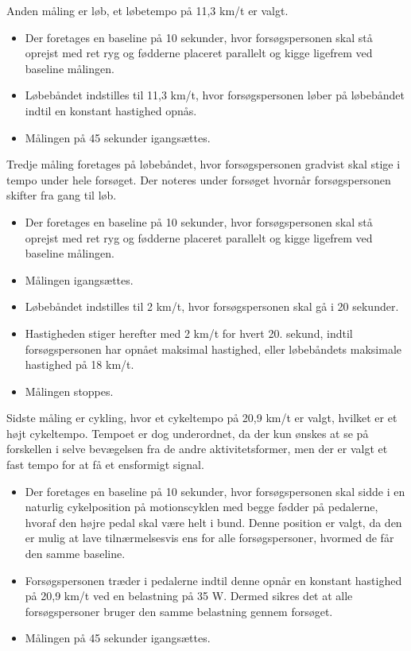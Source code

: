 Anden måling er løb, et løbetempo på 11,3 km/t er valgt\citep{Miles2007}. \vspace{-3mm}
\begin{itemize}
	\item Der foretages en baseline på 10 sekunder, hvor forsøgspersonen skal stå oprejst med ret ryg og fødderne placeret parallelt og kigge ligefrem ved baseline målingen.
	\item Løbebåndet indstilles til 11,3 km/t, hvor forsøgspersonen løber på løbebåndet indtil en konstant hastighed opnås. 
	\item Målingen på 45 sekunder igangsættes.
\end{itemize}

Tredje måling foretages på løbebåndet, hvor forsøgspersonen gradvist skal stige i tempo under hele forsøget. Der noteres under forsøget hvornår forsøgspersonen skifter fra gang til løb.  \vspace{-3mm}
\begin{itemize}
	\item Der foretages en baseline på 10 sekunder, hvor forsøgspersonen skal stå oprejst med ret ryg og fødderne placeret parallelt og kigge ligefrem ved baseline målingen.
	\item Målingen igangsættes.
	\item Løbebåndet indstilles til 2 km/t, hvor forsøgspersonen skal gå i 20 sekunder.  
	\item Hastigheden stiger herefter med 2 km/t for hvert 20. sekund, indtil forsøgspersonen har opnået maksimal hastighed, eller løbebåndets maksimale hastighed på 18 km/t. 
	\item Målingen stoppes. 
\end{itemize}

Sidste måling er cykling, hvor et cykeltempo på 20,9 km/t er valgt, hvilket er et højt cykeltempo\citep{Miles2007}. Tempoet er dog underordnet, da der kun ønskes at se på forskellen i selve bevægelsen fra de andre aktivitetsformer, men der er valgt et fast tempo for at få et ensformigt signal. \vspace{-3mm}
\begin{itemize}
	\item Der foretages en baseline på 10 sekunder, hvor forsøgspersonen skal sidde i en naturlig cykelposition på motionscyklen med begge fødder på pedalerne, hvoraf den højre pedal skal være helt i bund. Denne position er valgt, da den er mulig at lave tilnærmelsesvis ens for alle forsøgspersoner, hvormed de får den samme baseline.
	\item Forsøgspersonen træder i pedalerne indtil denne opnår en konstant hastighed på 20,9 km/t ved en belastning på 35 W. Dermed sikres det at alle forsøgspersoner bruger den samme belastning gennem forsøget.  
	\item Målingen på 45 sekunder igangsættes. 
\end{itemize}

